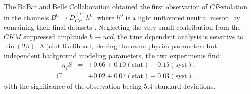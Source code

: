 The BaBar and Belle Collaboration obtained the first observation of $CP$-violation
in the channels $B^0 \to D^{(*)}_{CP} h^0$, where $h^0$ is a light unflavored neutral
meson, by combining their final datasets \cite{babar_belle_D0h0}. Neglecting the
very small contribution from the $CKM$ suppressed amplitude $b \to u\bar{c}d$,
the time dependent analysis is sensitive to $\sin(2\beta)$. A joint likelihood,
sharing the same physics parameters but independent background modeling parameters,
the two experiments find:
\begin{eqnarray}
-\eta_f S & = & +0.66 \pm 0.10 (\mbox{stat}) \pm 0.16 (\mbox{syst}), \\
C & = & +0.02 \pm 0.07 (\mbox{stat}) \pm 0.03 (\mbox{syst}), 
\end{eqnarray}
with the significance of the observation beeing 5.4 standard deviations. 
